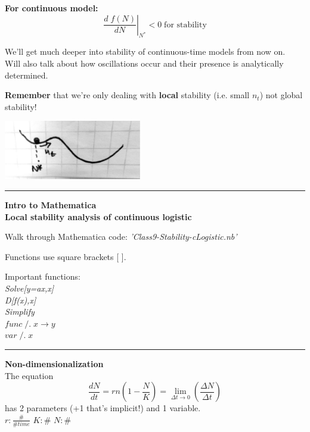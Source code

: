 \documentclass{article}
\newcommand{\note}[1]{\colorbox{gray!30}{#1}}
\newcommand{\ind}{\-\hspace{1cm}}
\begin{document}
\textbf{For continuous model:}\\
\begin{equation*}
\boxed{	\left.\frac{d\; f(N)}{dN} \right \vert_{N^*}<0  \; \text{for stability}}
\end{equation*}

We'll get much deeper into stability of continuous-time models from now on.  \\
Will also talk about how oscillations occur and their presence is analytically determined. 

\vspace{1cm}
\textbf{Remember} that we're only dealing with \textbf{local} stability (i.e. small $n_t$) not global stability!
\begin{center}
\includegraphics[width=6cm]{figs/LocalStability.pdf}
\end{center}

\rule[0.5ex]{\linewidth}{1pt}

\textbf{Intro to Mathematica}\\
\ind \textbf{Local stability analysis of continuous logistic}

\begin{center}
\note{Walk through Mathematica code: \emph{'Class9-Stability-cLogistic.nb'}}
\end{center}

Functions use square brackets [ ].

Important functions:\\
\ind \emph{Solve[y=ax,x]}\\
\ind \emph{D[f(x),x]}\\
\ind \emph{Simplify}\\
\ind $func\; /. \; x \to y$\\ 
\ind $var\; /. \; x$\\


\rule[0.5ex]{\linewidth}{1pt}

\pagebreak

\textbf{Non-dimensionalization}\\
The equation
\begin{equation*}
	\frac{dN}{dt}=rn\left(1-\frac{N}{K}\right) = \lim_{\Delta t\to 0}\left(\frac{\Delta N}{\Delta t}\right)
\end{equation*}
has 2 parameters (+1 that's implicit!) and 1 variable.\\
\ind \ind $r : \frac{\#}{\# time}$
\ind \ind $K : \#$
\ind \ind $N : \#$
\end{document}
